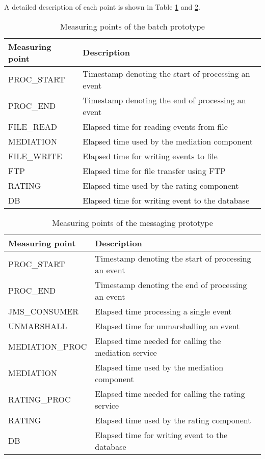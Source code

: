 A detailed description of each point is shown in Table \ref{table:measuring_points_batch} and \ref{table:measuring_points_messaging}.

\begin{table}
	\caption{Measuring points of the batch prototype}
	\label{table:measuring_points_batch}
	\centering
	\begin{tabular}{|l|p{5cm}|}
		\hline
		\bfseries Measuring point & \bfseries Description\\
		\hline
		PROC\_START & Timestamp denoting the start of processing an event\\
		\hline
		PROC\_END & Timestamp denoting the end of processing an event\\
		\hline
		FILE\_READ & Elapsed time for reading events from file\\
		\hline
		MEDIATION & Elapsed time used by the mediation component\\
		\hline
		FILE\_WRITE & Elapsed time for writing events to file\\
		\hline
		FTP & Elapsed time for file transfer using FTP\\
		\hline
		RATING & Elapsed time used by the rating component\\
		\hline
		DB & Elapsed time for writing event to the database\\
		\hline 
	\end{tabular}
\end{table}

\begin{table}[htpb]
	\renewcommand{\arraystretch}{1.5}
	\caption{Measuring points of the messaging prototype}
	\label{table:measuring_points_messaging}
	\centering
	\begin{tabular}{|l|p{4.5cm}|}
		\hline
		\bfseries Measuring point & \bfseries Description\\
		\hline
		PROC\_START & Timestamp denoting the start of processing an event\\
		\hline
		PROC\_END & Timestamp denoting the end of processing an event\\
		\hline
		JMS\_CONSUMER & Elapsed time processing a single event\\
		\hline
		UNMARSHALL & Elapsed time for unmarshalling an event\\
		\hline
		MEDIATION\_PROC & Elapsed time needed for calling the mediation service\\
		\hline
		MEDIATION & Elapsed time used by the mediation component\\
		\hline
		RATING\_PROC & Elapsed time needed for calling the rating service\\
		\hline
		RATING & Elapsed time used by the rating component\\
		\hline
		DB & Elapsed time for writing event to the database\\
		\hline 
	\end{tabular}
\end{table}

